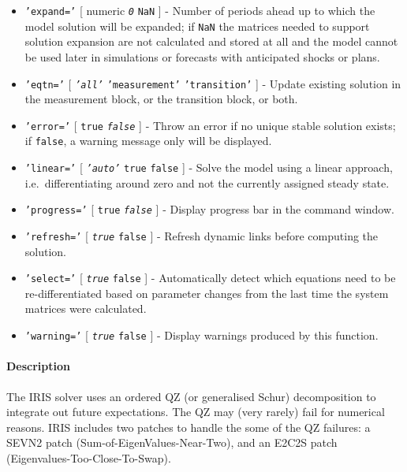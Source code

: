  \begin{itemize}
 \item
   \texttt{'expand='} {[} numeric \textbar{} \emph{\texttt{0}} \textbar{}
   \texttt{NaN} {]} - Number of periods ahead up to which the model
   solution will be expanded; if \texttt{NaN} the matrices needed to
   support solution expansion are not calculated and stored at all and
   the model cannot be used later in simulations or forecasts with
   anticipated shocks or plans.
 \item
   \texttt{'eqtn='} {[} \emph{\texttt{'all'}} \textbar{}
   \texttt{'measurement'} \textbar{} \texttt{'transition'} {]} - Update
   existing solution in the measurement block, or the transition block,
   or both.
 \item
   \texttt{'error='} {[} \texttt{true} \textbar{} \emph{\texttt{false}}
   {]} - Throw an error if no unique stable solution exists; if
   \texttt{false}, a warning message only will be displayed.
 \item
   \texttt{'linear='} {[} \emph{\texttt{'auto'}} \textbar{} \texttt{true}
   \textbar{} \texttt{false} {]} - Solve the model using a linear
   approach, i.e.~differentiating around zero and not the currently
   assigned steady state.
 \item
   \texttt{'progress='} {[} \texttt{true} \textbar{}
   \emph{\texttt{false}} {]} - Display progress bar in the command
   window.
 \item
   \texttt{'refresh='} {[} \emph{\texttt{true}} \textbar{} \texttt{false}
   {]} - Refresh dynamic links before computing the solution.
 \item
   \texttt{'select='} {[} \emph{\texttt{true}} \textbar{} \texttt{false}
   {]} - Automatically detect which equations need to be
   re-differentiated based on parameter changes from the last time the
   system matrices were calculated.
 \item
   \texttt{'warning='} {[} \emph{\texttt{true}} \textbar{} \texttt{false}
   {]} - Display warnings produced by this function.
 \end{itemize}
 
 \paragraph{Description}
 
 The IRIS solver uses an ordered QZ (or generalised Schur) decomposition
 to integrate out future expectations. The QZ may (very rarely) fail for
 numerical reasons. IRIS includes two patches to handle the some of the
 QZ failures: a SEVN2 patch (Sum-of-EigenValues-Near-Two), and an E2C2S
 patch (Eigenvalues-Too-Close-To-Swap).
 
